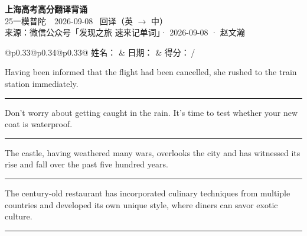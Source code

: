 \documentclass[11pt,a4paper]{article}
\newcommand{\num}[1]{\makebox[1.9em][r]{#1.}\hspace{0.3em}}
\newcommand{\wline}{\noindent\rule{\linewidth}{0.4pt}}
\begin{document}
\pagestyle{plain}
\begin{center}
{\LARGE\bfseries 上海高考高分翻译背诵 }\\[0.25em]
{\large 25一模普陀　2026-09-08 \quad\ 回译（英 $\to$ 中）}\\[0.35em]
{\footnotesize 来源：微信公众号「发现之旅 速来记单词」· 2026-09-08 · 赵文瀚}
\end{center}

\vspace{0.4em}
\noindent\begin{tabular}{@{}p{0.33\textwidth}@{}p{0.34\textwidth}@{}p{0.33\textwidth}@{}}
姓名：\underline{\hspace{2.0cm}} & 日期：\underline{\hspace{2.0cm}} & 得分：\underline{\hspace{1.4cm}}\,/ \\
\end{tabular}

\vspace{0.5em}

\vspace{0.8em}
\num{1}Having been informed that the flight had been cancelled, she rushed to the train station immediately.

\vspace{0.25em}

\wline

\num{2}Don’t worry about getting caught in the rain. It’s time to test whether your new coat is waterproof.

\vspace{0.25em}

\wline

\num{3}The castle, having weathered many wars, overlooks the city and has witnessed its rise and fall over the past five hundred years.

\vspace{0.25em}

\wline

\num{4}The century-old restaurant has incorporated culinary techniques from multiple countries and developed its own unique style, where diners can savor exotic culture.

\vspace{0.25em}

\wline
\end{document}
